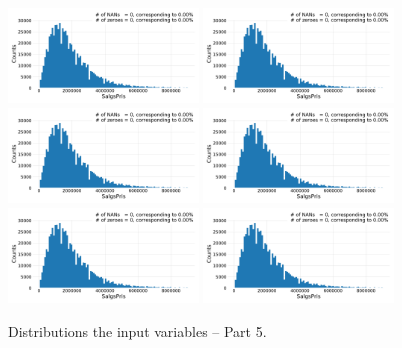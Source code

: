 \begin{figure}
  \subfloat{\qquad}
  \includegraphics[draft=false, width=0.45\textwidth, page=55, trim=15 0 15 0, clip]{figures/housing/overview_fig.pdf}\hfil
  \subfloat{\qquad}
  \includegraphics[draft=false, width=0.45\textwidth, page=56, trim=15 0 15 0, clip]{figures/housing/overview_fig.pdf}
  \subfloat{\qquad}
  \includegraphics[draft=false, width=0.45\textwidth, page=57, trim=15 0 15 0, clip]{figures/housing/overview_fig.pdf}\hfil
  \subfloat{\qquad}
  \includegraphics[draft=false, width=0.45\textwidth, page=58, trim=15 0 15 0, clip]{figures/housing/overview_fig.pdf}
  \subfloat{\qquad}
  \includegraphics[draft=false, width=0.45\textwidth, page=59, trim=15 0 15 0, clip]{figures/housing/overview_fig.pdf}\hfil
  \subfloat{\qquad}
  \includegraphics[draft=false, width=0.45\textwidth, page=60, trim=15 0 15 0, clip]{figures/housing/overview_fig.pdf}
  \caption[Distributions of the Input Variables -- Part 5]{Distributions the input variables -- Part 5.}
  \label{fig:h:variable_overview_all_5}
  \vspace{\abovecaptionskip}
\end{figure}

